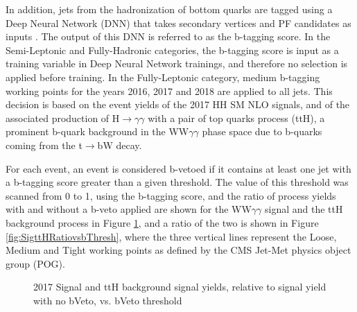 In addition, jets from the hadronization of bottom quarks are tagged using a Deep Neural Network (DNN) that takes secondary vertices and PF 
candidates as inputs \cite{Sirunyan:2017ezt}. The output of this DNN is referred to as the b-tagging score. In the Semi-Leptonic and Fully-Hadronic categories, the b-tagging score is input as a training variable
in Deep Neural Network trainings, and therefore no selection is applied before training. In the Fully-Leptonic category, medium b-tagging working points
for the years 2016, 2017 and 2018 are applied to all jets. This decision is based on the event yields of the 2017 HH SM NLO signals, and of the associated production of H$\rightarrow\gamma\gamma$ with a pair of top quarks process (ttH), a prominent b-quark background
in the WW$\gamma\gamma$ phase space due to b-quarks coming from the t$\rightarrow$bW decay. 

For each event, an event is considered b-vetoed if it contains at least one jet with a b-tagging score greater than a given threshold. The value of this threshold was scanned from 0 to 1, using the b-tagging score, and the ratio of process yields with and without a b-veto applied are shown for the WW$\gamma\gamma$ signal and
the ttH background process in Figure \ref{fig:YieldVsBThresh}, and a ratio of the two is shown in Figure \ref{fig:SigttHRatiovsbThresh}, where the three vertical lines represent
the Loose, Medium and Tight working points as defined by the CMS Jet-Met physics object group (POG).

\begin{figure}[H]
    \setcounter{subfigure}{0}
    \centering
    \qquad
    \caption{2017 Signal and ttH background signal yields, relative to signal yield with no bVeto, vs. bVeto threshold}
    \label{fig:YieldVsBThresh}
\end{figure}

